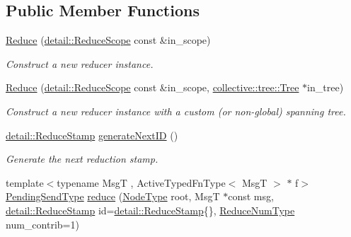 \subsection*{Public Member Functions}
\begin{DoxyCompactItemize}
\item 
\hyperlink{structvt_1_1collective_1_1reduce_1_1_reduce_a5e5a3c0e00259bec5aad517aeaba36ac}{Reduce} (\hyperlink{structvt_1_1collective_1_1reduce_1_1detail_1_1_reduce_scope}{detail\+::\+Reduce\+Scope} const \&in\+\_\+scope)
\begin{DoxyCompactList}\small\item\em Construct a new reducer instance. \end{DoxyCompactList}\item 
\hyperlink{structvt_1_1collective_1_1reduce_1_1_reduce_a346fd6b262828a501c342330fc091fec}{Reduce} (\hyperlink{structvt_1_1collective_1_1reduce_1_1detail_1_1_reduce_scope}{detail\+::\+Reduce\+Scope} const \&in\+\_\+scope, \hyperlink{structvt_1_1collective_1_1tree_1_1_tree}{collective\+::tree\+::\+Tree} $\ast$in\+\_\+tree)
\begin{DoxyCompactList}\small\item\em Construct a new reducer instance with a custom (or non-\/global) spanning tree. \end{DoxyCompactList}\item 
\hyperlink{namespacevt_1_1collective_1_1reduce_1_1detail_abcd205dec83706f347d55c7528bf2664}{detail\+::\+Reduce\+Stamp} \hyperlink{structvt_1_1collective_1_1reduce_1_1_reduce_ac279b15e3bb5754d03307e2fe23ec734}{generate\+Next\+ID} ()
\begin{DoxyCompactList}\small\item\em Generate the next reduction stamp. \end{DoxyCompactList}\item 
{\footnotesize template$<$typename MsgT , Active\+Typed\+Fn\+Type$<$ Msg\+T $>$ $\ast$ f$>$ }\\\hyperlink{structvt_1_1collective_1_1reduce_1_1_reduce_a0474b491f3c93014d9a0ce0356c6bfd5}{Pending\+Send\+Type} \hyperlink{structvt_1_1collective_1_1reduce_1_1_reduce_adf8bd9748a220a3ed29087c30f8adafc}{reduce} (\hyperlink{namespacevt_a866da9d0efc19c0a1ce79e9e492f47e2}{Node\+Type} root, MsgT $\ast$const msg, \hyperlink{namespacevt_1_1collective_1_1reduce_1_1detail_abcd205dec83706f347d55c7528bf2664}{detail\+::\+Reduce\+Stamp} id=\hyperlink{namespacevt_1_1collective_1_1reduce_1_1detail_abcd205dec83706f347d55c7528bf2664}{detail\+::\+Reduce\+Stamp}\{\}, \hyperlink{structvt_1_1collective_1_1reduce_1_1_reduce_a6c3e63aca10c31d2823b0b18cf9762a4}{Reduce\+Num\+Type} num\+\_\+contrib=1)

\end{DoxyCompactItemize}
